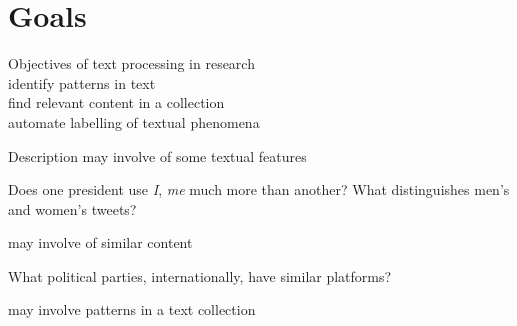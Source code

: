 \section{Goals}

\begin{points}{Objectives of text processing in research}
	\vfill
	\p {}\\ identify patterns in text
	\vfill
	\p {}\\ find relevant content in a collection
	\vfill
	\p {}\\ automate labelling of textual phenomena
	\vfill
\end{points}

\begin{points}{Description}
	\p may involve  of some textual features
	\begin{itemize}
		\p Does one president use \emph{I}, \emph{me} much more than another?
	   \p What distinguishes men's and women's tweets?
	\end{itemize}
	\p may involve  of similar content
	\begin{itemize}
		\p What political parties, internationally, have similar platforms?
	\end{itemize}
	\p may involve  patterns in a text collection
\end{points}

